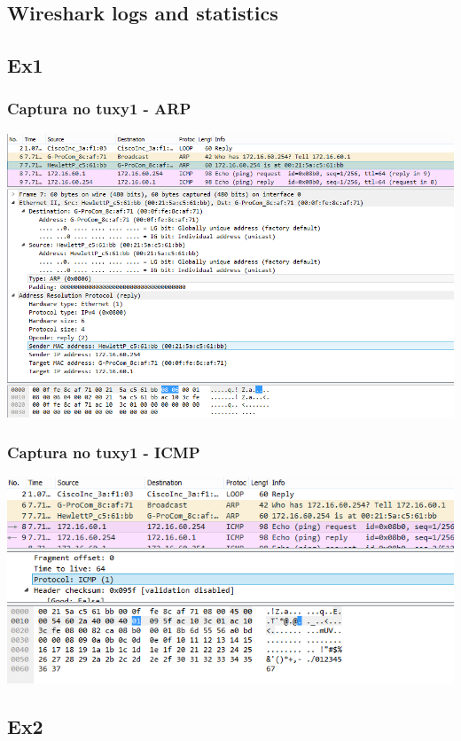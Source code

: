 \documentclass[11pt,a4paper,reqno]{report}
\numberwithin{equation}{section}
\begin{document}
\begin{appendices}
\chapter{Wireshark logs and statistics}%

\section{Ex1}%
\label{ex1_headers}
\subsection{Captura no tuxy1 - ARP}
\includegraphics[width=18cm]{ex1_arp.png}
\subsection{Captura no tuxy1 - ICMP}
\includegraphics[width=18cm]{ex1_icmp.png}

\section{Ex2}%
\label{ex_2}

\end{appendices}
\end{document}
